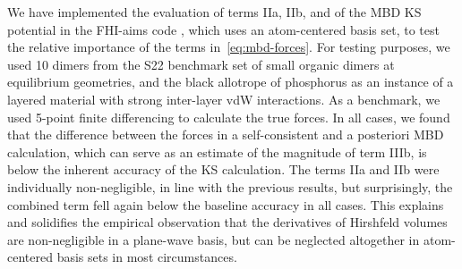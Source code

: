 We have implemented the evaluation of terms IIa, IIb, and of the MBD KS potential in the FHI-aims code \citep{BlumCPC09}, which uses an atom-centered basis set, to test the relative importance of the terms in~\eqref{eq:mbd-forces}.
For testing purposes, we used 10 dimers from the S22 benchmark set of small organic dimers at equilibrium geometries, and the black allotrope of phosphorus as an instance of a layered material with strong inter-layer vdW interactions.
As a benchmark, we used 5-point finite differencing to calculate the true forces.
In all cases, we found that the difference between the forces in a self-consistent and a posteriori MBD calculation, which can serve as an estimate of the magnitude of term IIIb, is below the inherent accuracy of the KS calculation.
The terms IIa and IIb were individually non-negligible, in line with the previous results, but surprisingly, the combined term fell again below the baseline accuracy in all cases.
This explains and solidifies the empirical observation that the derivatives of Hirshfeld volumes are non-negligible in a plane-wave basis, but can be neglected altogether in atom-centered basis sets in most circumstances.
